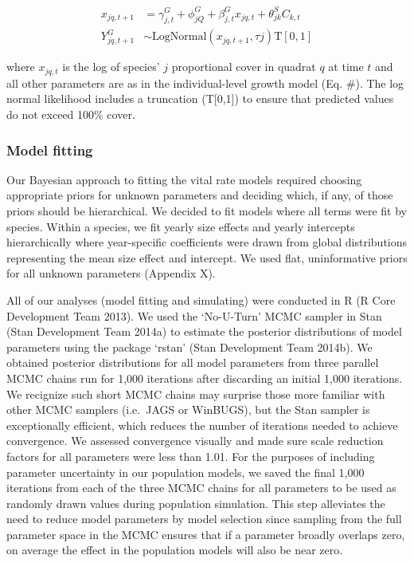 \documentclass[12pt,]{article}
\begin{document}
\begin{align}
x_{jq,t+1} &= \gamma^{G}_{j,t} + \phi^{G}_{jQ} + \beta^{G}_{j,t}x_{jq,t} + \theta^{S}_{jk}C_{k,t} \\
Y^{G}_{jq,t+1} &\sim \text{LogNormal}(x_{jq,t+1}, \tau{j}) \text{T}[0,1]
\end{align}

where \(x_{jq,t}\) is the log of species' \(j\) proportional cover in
quadrat \(q\) at time \(t\) and all other parameters are as in the
individual-level growth model (Eq. \#). The log normal likelihood
includes a truncation (T{[}0,1{]}) to ensure that predicted values do
not exceed 100\% cover.

\subsubsection{Model fitting}\label{model-fitting}

Our Bayesian approach to fitting the vital rate models required choosing
appropriate priors for unknown parameters and deciding which, if any, of
those priors should be hierarchical. We decided to fit models where all
terms were fit by species. Within a species, we fit yearly size effects
and yearly intercepts hierarchically where year-specific coefficients
were drawn from global distributions representing the mean size effect
and intercept. We used flat, uninformative priors for all unknown
parameters (Appendix X).

All of our analyses (model fitting and simulating) were conducted in R
(R Core Development Team 2013). We used the `No-U-Turn' MCMC sampler in
Stan (Stan Development Team 2014a) to estimate the posterior
distributions of model parameters using the package `rstan' (Stan
Development Team 2014b). We obtained posterior distributions for all
model parameters from three parallel MCMC chains run for 1,000
iterations after discarding an initial 1,000 iterations. We recignize
such short MCMC chains may surprise those more familiar with other MCMC
samplers (i.e.~JAGS or WinBUGS), but the Stan sampler is exceptionally
efficient, which reduces the number of iterations needed to achieve
convergence. We assessed convergence visually and made sure scale
reduction factors for all parameters were less than 1.01. For the
purposes of including parameter uncertainty in our population models, we
saved the final 1,000 iterations from each of the three MCMC chains for
all parameters to be used as randomly drawn values during population
simulation. This step alleviates the need to reduce model parameters by
model selection since sampling from the full parameter space in the MCMC
ensures that if a parameter broadly overlaps zero, on average the effect
in the population models will also be near zero.
\end{document}
